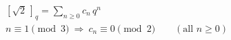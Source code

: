 \documentclass{article}
\begin{document}
\[
\begin{aligned}
&[\sqrt2\,]_q=\sum_{n\ge0}c_n\,q^{n}\\
&n\equiv1\pmod 3\ \Longrightarrow\ c_n\equiv0\pmod 2\qquad(\text{all }n\ge0)
\end{aligned}
\]
\end{document}
